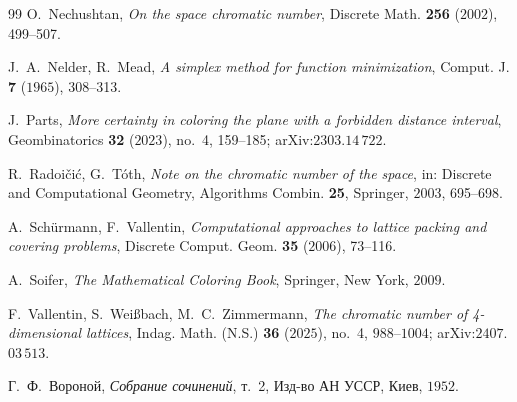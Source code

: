 \documentclass[11pt]{article}
\theoremstyle{definition}
\theoremstyle{remark}
\begin{document}
\begin{thebibliography}{99}
 O.~Nechushtan,
\emph{On the space chromatic number},
Discrete Math. \textbf{256} ($2002$), 499--507.

 J.~A.~Nelder, R.~Mead,
\emph{A simplex method for function minimization},
Comput. J. \textbf{7} ($1965$), 308--313.

 J.~Parts,
\emph{More certainty in coloring the plane with a forbidden distance
interval},
Geombinatorics \textbf{32} ($2023$), no.~4, 159--185; arXiv:$2303$.$14\,722$.

 R.~Radoi\v{c}i\'c, G.~T\'oth,
\emph{Note on the chromatic number of the space},
in: Discrete and Computational Geometry, Algorithms Combin. \textbf{25},
Springer, $2003$, 695--698.

 A.~Sch\"urmann, F.~Vallentin,
\emph{Computational approaches to lattice packing and covering problems},
Discrete Comput. Geom. \textbf{35} ($2006$), 73--116.

 A.~Soifer,
\emph{The Mathematical Coloring Book}, Springer, New York, $2009$.

 F.~Vallentin, S.~Wei\ss bach, M.~C.~Zimmermann,
\emph{The chromatic number of 4-dimensional lattices},
Indag. Math. (N.S.) \textbf{36} ($2025$), no.~4, $988$--$1004$; arXiv:$2407$.$03\,513$.

 Г.~Ф.~Вороной,
\emph{Собрание сочинений}, т.~2, Изд-во АН УССР, Киев, $1952$.

\end{thebibliography}
\end{document}
